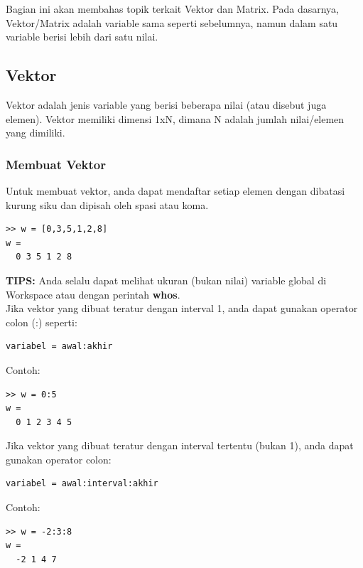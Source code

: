 \documentclass[12pt]{book}
\begin{document}
	Bagian ini akan membahas topik terkait Vektor dan Matrix.
	Pada dasarnya, Vektor/Matrix adalah variable sama seperti sebelumnya,
	namun dalam satu variable berisi lebih dari satu nilai.
	
	\subsection{Vektor}
	
	Vektor adalah jenis variable yang berisi beberapa nilai (atau disebut juga elemen).
	Vektor memiliki dimensi 1xN, dimana N adalah jumlah nilai/elemen yang dimiliki.
	
	\subsubsection{Membuat Vektor}
		
	Untuk membuat vektor, anda dapat mendaftar setiap elemen dengan dibatasi kurung siku dan dipisah oleh spasi atau koma.
	\begin{verbatim}
>> w = [0,3,5,1,2,8]
w = 
  0 3 5 1 2 8
	\end{verbatim}

	\textbf{TIPS:} Anda selalu dapat melihat ukuran (bukan nilai) variable global di Workspace atau dengan perintah \textbf{whos}.\\
	
	Jika vektor yang dibuat teratur dengan interval 1, anda dapat gunakan operator colon (:) seperti:
	\begin{verbatim}
variabel = awal:akhir
	\end{verbatim}

	Contoh:
	\begin{verbatim}
>> w = 0:5
w = 
  0 1 2 3 4 5
	\end{verbatim}

	Jika vektor yang dibuat teratur dengan interval tertentu (bukan 1), anda dapat gunakan operator colon:
	\begin{verbatim}
variabel = awal:interval:akhir
	\end{verbatim}

	Contoh:
	\begin{verbatim}
>> w = -2:3:8
w = 
  -2 1 4 7
	\end{verbatim}
\end{document}
